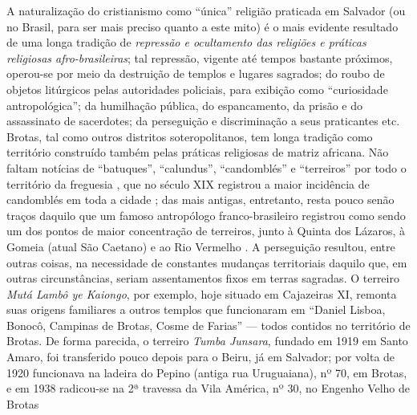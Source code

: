 A naturalização do cristianismo como ``única'' religião praticada em Salvador (ou no Brasil, para ser mais preciso quanto a este mito) é o mais evidente resultado de uma longa tradição de \textit{repressão e ocultamento das religiões e práticas religiosas afro-brasileiras}; tal repressão, vigente até tempos bastante próximos, operou-se por meio da destruição de templos e lugares sagrados; do roubo de objetos litúrgicos pelas autoridades policiais, para exibição como ``curiosidade antropológica''; da humilhação pública, do espancamento, da prisão e do assassinato de sacerdotes; da perseguição e discriminação a seus praticantes etc. Brotas, tal como outros distritos soteropolitanos, tem longa tradição como território construído também pelas práticas religiosas de matriz africana. Não faltam notícias de ``batuques'', ``calundus'', ``candomblés'' e ``terreiros'' por todo o território da freguesia \cite{carneiro_candomble_1954,reis_domingos_2008,REISSILVA1989}, que no século XIX registrou a maior incidência de candomblés em toda a cidade \cite[p.~60]{santana_itiner_2008}; das mais antigas, entretanto, resta pouco senão traços daquilo que um famoso antropólogo franco-brasileiro registrou como sendo um dos pontos de maior concentração de terreiros, junto à Quinta dos Lázaros, à Gomeia (atual São Caetano) e ao Rio Vermelho \cite{bastide_mystique_1978}. A perseguição resultou, entre outras coisas, na necessidade de constantes mudanças territoriais daquilo que, em outras circunstâncias, seriam assentamentos fixos em terras sagradas. O terreiro \textit{Mutá Lambô ye Kaiongo}, por exemplo, hoje situado em Cajazeiras XI, remonta suas origens familiares a outros templos que funcionaram em ``Daniel Lisboa, Bonocô, Campinas de Brotas, Cosme de Farias'' \cite[p.~50]{alves_paquetan_2010} --- todos contidos no território de Brotas. De forma parecida, o terreiro \textit{Tumba Junsara}, fundado em 1919 em Santo Amaro, foi transferido pouco depois para o Beiru, já em Salvador; por volta de 1920 funcionava na ladeira do Pepino (antiga rua Uruguaiana), nº 70, em Brotas, e em 1938 radicou-se na 2ª travessa da Vila América, nº 30, no Engenho Velho de Brotas \cite[p.~61]{rego_terreiros_2006}

